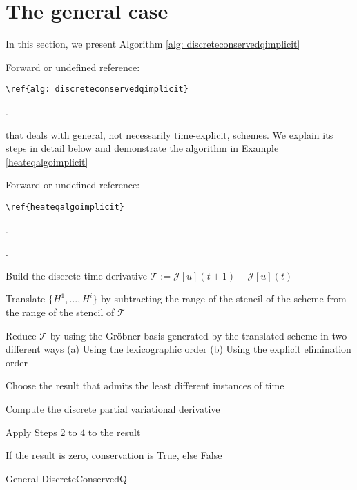 \documentclass[runningheads]{llncs}
\newcommand{\1}{\chi}
\begin{document}
\section{The general case}
\label{secgen}
In this section, we present Algorithm \ref{alg: discreteconservedqimplicit}
 {\color{red} Forward or undefined reference: \begin{verbatim}\ref{alg: discreteconservedqimplicit}\end{verbatim}.}
 that deals with general, not necessarily time-explicit, schemes. We explain its steps in detail below and demonstrate the algorithm in Example \ref{heateqalgoimplicit}
 {\color{red} Forward or undefined reference: \begin{verbatim}\ref{heateqalgoimplicit}\end{verbatim}.}
.
\begin{algorithm}
	\DontPrintSemicolon
	
	\label{step1} Build the discrete time derivative \(\mathcal{T}:=\mathcal{J}[u](t+1)-\mathcal{J}[u](t)\)\;
	
	\label{step2}Translate \(\{H^1,\ldots,H^i\}\) by subtracting the range of the stencil of the scheme from the range of the stencil of \(\mathcal{T}\)\;
	
	\label{step3} Reduce \(\mathcal{T}\) by using {\color{red} the Gr{\"o}bner basis} generated by the translated scheme in two different ways
	\label{step3a} (a) Using the lexicographic order
	\label{step3b} (b) Using the explicit elimination order\;
	
	\label{step4} Choose the result that admits the least different instances of time\;
	
	\label{step5} Compute the discrete partial variational derivative\;
	
	\label{step6} Apply Steps 2 to 4 to the result\;
	
	\label{step7} If the result is zero, conservation is {\sc True}, else {\sc False}\;
	
	\caption{{\sc General DiscreteConservedQ}}
	\label{alg: discreteconservedqimplicit}
\end{algorithm}
\end{document}
